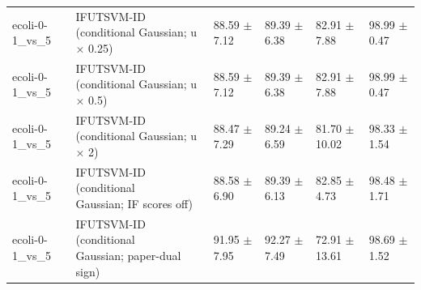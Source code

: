 \begin{table}[!t]
{\begin{tabular}{llllll}
ecoli-0-1\_vs\_5 & \shortstack[l]{IFUTSVM-ID (conditional\\Gaussian; u \(\times\) 0.25)} & 88.59 \(\pm\) 7.12 & 89.39 \(\pm\) 6.38 & 82.91 \(\pm\) 7.88 & 98.99 \(\pm\) 0.47 \\
ecoli-0-1\_vs\_5 & \shortstack[l]{IFUTSVM-ID (conditional\\Gaussian; u \(\times\) 0.5)} & 88.59 \(\pm\) 7.12 & 89.39 \(\pm\) 6.38 & 82.91 \(\pm\) 7.88 & 98.99 \(\pm\) 0.47 \\
ecoli-0-1\_vs\_5 & \shortstack[l]{IFUTSVM-ID (conditional\\Gaussian; u \(\times\) 2)} & 88.47 \(\pm\) 7.29 & 89.24 \(\pm\) 6.59 & 81.70 \(\pm\) 10.02 & 98.33 \(\pm\) 1.54 \\
ecoli-0-1\_vs\_5 & \shortstack[l]{IFUTSVM-ID (conditional\\Gaussian; IF scores off)} & 88.58 \(\pm\) 6.90 & 89.39 \(\pm\) 6.13 & 82.85 \(\pm\) 4.73 & 98.48 \(\pm\) 1.71 \\
ecoli-0-1\_vs\_5 & \shortstack[l]{IFUTSVM-ID (conditional\\Gaussian; paper-dual\\sign)} & 91.95 \(\pm\) 7.95 & 92.27 \(\pm\) 7.49 & 72.91 \(\pm\) 13.61 & 98.69 \(\pm\) 1.52 \\
\hline
\end{tabular}%
}
\end{table}

